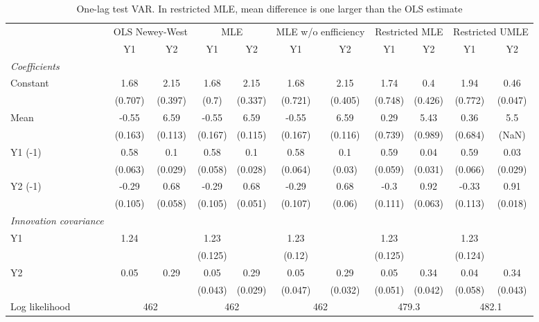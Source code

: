 \begin{table}[htbp] 
	\centering 
	\begin{tabular}{@{\extracolsep{4pt}}lcccccccccc@{}}		\hline\hline
		 		 & \multicolumn{2}{c}{OLS Newey-West} &\multicolumn{2}{c}{MLE} &\multicolumn{2}{c}{MLE w/o enfficiency} &\multicolumn{2}{c}{Restricted MLE} &\multicolumn{2}{c}{Restricted UMLE} \\ 
 		 & Y1 	 & Y2 	 & Y1 	 & Y2 	 & Y1 	 & Y2 	 & Y1 	 & Y2 	 & Y1 	 & Y2\\\cline{2-3}\cline{4-5}\cline{6-7}\cline{8-9}\cline{10-11}
\rule{0pt}{4ex} 
 \emph{Coefficients} 	  		 & 		 & 		 & 		 & 		 & 		 & 		 & 		 & 		 & 		 &\\ 
\quad Constant 	 & 1.68 	 & 2.15 	 & 1.68 	 & 2.15 	 & 1.68 	 & 2.15 	 & 1.74 	 & 0.4 	 & 1.94 	 & 0.46	 \\ 
 		 & (0.707) 	 & (0.397) 	 & (0.7) 	 & (0.337) 	 & (0.721) 	 & (0.405) 	 & (0.748) 	 & (0.426) 	 & (0.772) 	 & (0.047) 	 \\ 
\quad Mean 	 & -0.55 	 & 6.59 	 & -0.55 	 & 6.59 	 & -0.55 	 & 6.59 	 & 0.29 	 & 5.43 	 & 0.36 	 & 5.5	 \\ 
 		 & (0.163) 	 & (0.113) 	 & (0.167) 	 & (0.115) 	 & (0.167) 	 & (0.116) 	 & (0.739) 	 & (0.989) 	 & (0.684) 	 & (NaN) 	 \\ 
\quad Y1 (-1) 	 &0.58 	 & 0.1 	 & 0.58 	 & 0.1 	 & 0.58 	 & 0.1 	 & 0.59 	 & 0.04 	 & 0.59 	 & 0.03	 \\ 
 		 & (0.063) 	 & (0.029) 	 & (0.058) 	 & (0.028) 	 & (0.064) 	 & (0.03) 	 & (0.059) 	 & (0.031) 	 & (0.066) 	 & (0.029) 	 \\ 
\quad Y2 (-1) 	 &-0.29 	 & 0.68 	 & -0.29 	 & 0.68 	 & -0.29 	 & 0.68 	 & -0.3 	 & 0.92 	 & -0.33 	 & 0.91	 \\ 
 		 & (0.105) 	 & (0.058) 	 & (0.105) 	 & (0.051) 	 & (0.107) 	 & (0.06) 	 & (0.111) 	 & (0.063) 	 & (0.113) 	 & (0.018) 	 \\ 
\rule{0pt}{4ex} \emph{Innovation covariance}  	 & 	 & 	 & 	 & 	 & 	 & 	 & 	 & 	 & 	 &\\ 
\quad Y1 	 &1.24 	 &  	 & 1.23 	 &  	 & 1.23 	 &  	 & 1.23 	 &  	 & 1.23 	 & 	 \\ 
 		 &  	 &  	 & (0.125) 	 &  	 & (0.12) 	 &  	 & (0.125) 	 &  	 & (0.124) 	 &  	 \\ 
\quad Y2 	 &0.05 	 & 0.29 	 & 0.05 	 & 0.29 	 & 0.05 	 & 0.29 	 & 0.05 	 & 0.34 	 & 0.04 	 & 0.34	 \\ 
 		 &  	 &  	 & (0.043) 	 & (0.029) 	 & (0.047) 	 & (0.032) 	 & (0.051) 	 & (0.042) 	 & (0.058) 	 & (0.043) 	 \\ 
 \hline \rule{0pt}{4ex} 
  Log likelihood 	 &\multicolumn{2}{c}{462} 	 & \multicolumn{2}{c}{462} 	 & \multicolumn{2}{c}{462} 	 & \multicolumn{2}{c}{479.3} 	 & \multicolumn{2}{c}{482.1}\\ 

 \hline 	\end{tabular}		\caption{One-lag test VAR. In restricted MLE, mean difference is one
           larger than the OLS estimate}
		\label{tab:onelag}

\end{table}